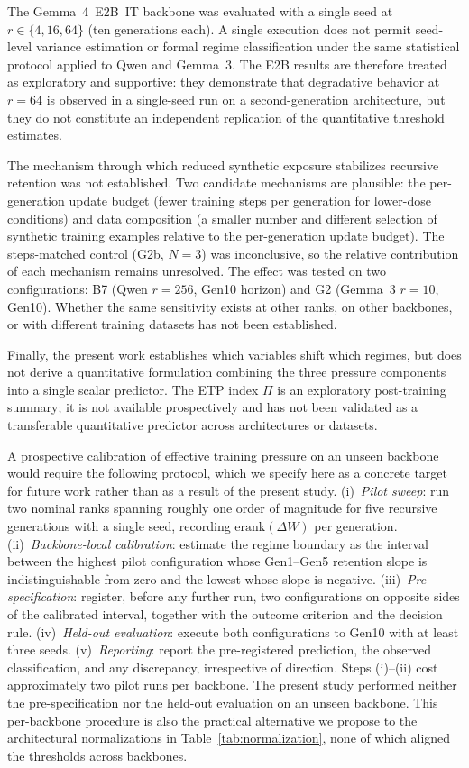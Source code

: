 \documentclass[a4paper,fleqn]{cas-dc}
\newif\ifshowchanges
\newcommand{\rev}[1]{\ifshowchanges{\color{blue}#1}\else{#1}\fi}
\begin{document}
\rev{The Gemma~4~E2B~IT backbone was evaluated with a single seed at $r \in \{4, 16, 64\}$
(ten generations each). A single execution does not permit
seed-level variance estimation or formal regime classification under the
same statistical protocol applied to Qwen and Gemma~3. The E2B results are
therefore treated as exploratory and supportive: they demonstrate that degradative behavior at $r=64$ is \rev{observed in a single-seed run} on a second-generation
architecture, but they do not constitute an independent replication of the
quantitative threshold estimates.}

\rev{The mechanism through which reduced synthetic exposure {stabilizes}
recursive retention was not established. Two candidate mechanisms are
plausible: the per-generation update budget (fewer training steps per
generation for lower-dose conditions) and data composition (\rev{a smaller number and different selection of synthetic training examples}
relative to the per-generation update budget). The
steps-matched control (G2b, \rev{$N=3$}) was inconclusive, so the
relative contribution of each mechanism remains unresolved. The effect
was tested on two configurations: B7 (Qwen $r=256$, Gen10
horizon) and G2 (Gemma~3 $r=10$, Gen10). Whether the same sensitivity exists at other
ranks, on other backbones, or with different training datasets
has not been established.}

Finally, the present work establishes which variables shift which
regimes, but does not derive a quantitative formulation combining the
three pressure components into a single scalar predictor.
\rev{The ETP index $\Pi$ is an exploratory post-training summary; it is not
available prospectively and has not been validated as a transferable
quantitative predictor across architectures or datasets.}



\rev{A prospective calibration of effective training pressure on an
unseen backbone would require the following protocol, which we specify
here as a concrete target for future work rather than as a result of the
present study. (i)~\emph{Pilot sweep}: run two nominal ranks spanning
roughly one order of magnitude for five recursive generations with a
single seed, recording $\mathrm{erank}(\Delta W)$ per generation.
(ii)~\emph{Backbone-local calibration}: estimate the regime boundary as
the interval between the highest pilot configuration whose Gen1--Gen5
retention slope is indistinguishable from zero and the lowest whose
slope is negative. (iii)~\emph{Pre-specification}: register, before any
further run, two configurations on opposite sides of the calibrated
interval, together with the outcome criterion and the decision rule.
(iv)~\emph{Held-out evaluation}: execute both configurations to Gen10
with at least three seeds. (v)~\emph{Reporting}: report the
pre-registered prediction, the observed classification, and any
discrepancy, irrespective of direction. Steps (i)--(ii) cost
approximately two pilot runs per backbone. The present study performed
neither the pre-specification nor the held-out evaluation on an unseen
backbone. This per-backbone procedure is also the practical alternative
we propose to the architectural normalizations in
Table~\ref{tab:normalization}, none of which aligned the thresholds
across backbones.}
\end{document}
